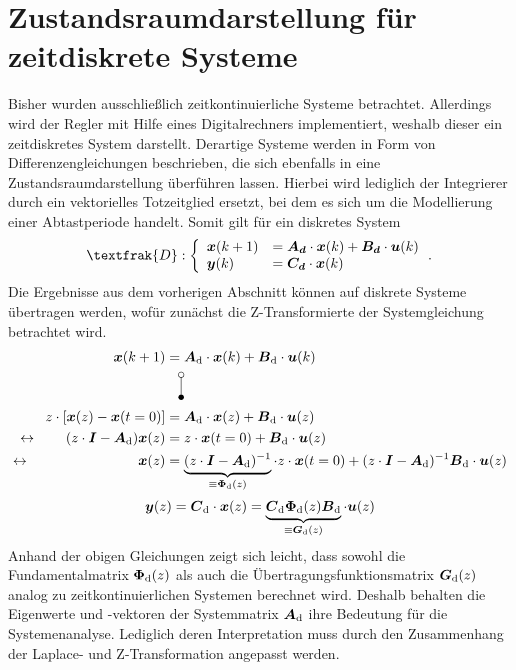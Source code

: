 \section{Zustandsraumdarstellung für zeitdiskrete Systeme}
Bisher wurden ausschließlich zeitkontinuierliche Systeme betrachtet. Allerdings wird der Regler mit Hilfe eines Digitalrechners implementiert, weshalb dieser ein zeitdiskretes System darstellt.  Derartige Systeme werden in Form von Differenzengleichungen beschrieben, die sich ebenfalls in eine Zustandsraumdarstellung überführen lassen. Hierbei wird lediglich der Integrierer durch ein vektorielles Totzeitglied ersetzt, bei dem es sich um die Modellierung einer Abtastperiode handelt.  Somit gilt für ein diskretes System 
\begin{equation}
\textfrak{D} : \left\{ \begin{array}{ll}
\bs{{x}}(k+1) &= \bs{A_d}\cdot \bs{x}(k) + \bs{B_d}\cdot \bs{u}(k) \\
\bs{y}(k) &= \bs{C_d}\cdot \bs{x}(k)
\end{array}\,.
\right.
\label{eq_discrete_ss}
\end{equation}
Die Ergebnisse aus dem vorherigen Abschnitt können auf diskrete Systeme übertragen werden, wofür zunächst die Z-Transformierte der Systemgleichung betrachtet wird.
\begin{align}
\bs{x}(k+1) &= \bs{A}\idx{d}\cdot \bs{x}(k)+\bs{B}\idx{d}\cdot \bs{u}(k)
\nonumber \\
&\hspace{5pt}\vlaplace \nonumber \\
z\cdot \left[\bs{x}(z)- \bs{x}(t=0)\right] &= \bs{A}\idx{d}\cdot \bs{x}(z) + \bs{B}\idx{d}\cdot \bs{u}(z) \nonumber \nonumber \\
\leftrightarrow\hspace{20pt}
(z\cdot\bs{I}-\bs{A}\idx{d})\bs{x}(z) &= z\cdot \bs{x}(t=0)+\bs{B}\idx{d}\cdot \bs{u}(z) \nonumber
\\
\leftrightarrow\hspace{77pt}
\bs{x}(z) &= \underbrace{(z\cdot\bs{I}-\bs{A}\idx{d})^{-1}}_{\equiv \bs{\Phi}\idx{d}(z)}\cdot z\cdot \bs{x}(t=0) + (z\cdot \bs{I}-\bs{A}\idx{d})^{-1}\bs{B}\idx{d}\cdot \bs{u}(z)
\end{align}
\begin{equation}
\boldsymbol{y}(z) = \boldsymbol{C}_{\text{d}}\cdot \boldsymbol{x}(z) = \underbrace{\boldsymbol{C}_{\text{d}}\boldsymbol{\Phi}_{\text{d}}(z)\boldsymbol{B}_{\text{d}}}_{\equiv \boldsymbol{G}_{\text{d}}(z)}\cdot \boldsymbol{u}(z)
\end{equation}
Anhand der obigen Gleichungen zeigt sich leicht, dass sowohl die Fundamentalmatrix $\boldsymbol{\Phi}_{\text{d}}(z)$ als auch die Übertragungsfunktionsmatrix $\boldsymbol{G}_{\text{d}}(z)$ analog zu zeitkontinuierlichen Systemen berechnet wird. Deshalb behalten die Eigenwerte und -vektoren der Systemmatrix $\boldsymbol{A}_{\text{d}}$ ihre Bedeutung für die Systemenanalyse. Lediglich deren Interpretation muss durch den Zusammenhang der Laplace- und Z-Transformation angepasst werden.
